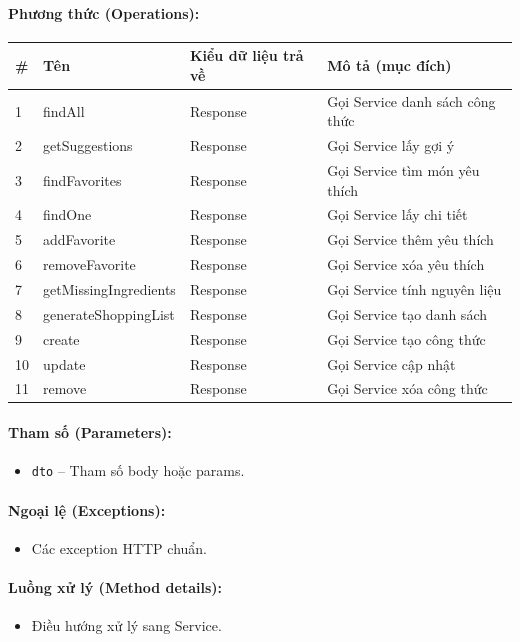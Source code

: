 \documentclass[12pt,a4paper]{article}
\begin{document}
\paragraph{Phương thức (Operations):}
\begin{longtable}{|p{0.6cm}|p{3.8cm}|p{2.6cm}|p{6.5cm}|}
\hline
\textbf{\#} & \textbf{Tên} & \textbf{Kiểu dữ liệu trả về} & \textbf{Mô tả (mục đích)} \\ \hline
\endhead
1 & findAll & Response & Gọi Service danh sách công thức \\ \hline
2 & getSuggestions & Response & Gọi Service lấy gợi ý \\ \hline
3 & findFavorites & Response & Gọi Service tìm món yêu thích \\ \hline
4 & findOne & Response & Gọi Service lấy chi tiết \\ \hline
5 & addFavorite & Response & Gọi Service thêm yêu thích \\ \hline
6 & removeFavorite & Response & Gọi Service xóa yêu thích \\ \hline
7 & getMissingIngredients & Response & Gọi Service tính nguyên liệu \\ \hline
8 & generateShoppingList & Response & Gọi Service tạo danh sách \\ \hline
9 & create & Response & Gọi Service tạo công thức \\ \hline
10 & update & Response & Gọi Service cập nhật \\ \hline
11 & remove & Response & Gọi Service xóa công thức \\ \hline
\end{longtable}

\paragraph{Tham số (Parameters):}
\begin{itemize}[leftmargin=*]
    \item \texttt{dto} – Tham số body hoặc params.
\end{itemize}


\paragraph{Ngoại lệ (Exceptions):}
\begin{itemize}[leftmargin=*]
    \item Các exception HTTP chuẩn.
\end{itemize}


\paragraph{Luồng xử lý (Method details):}
\begin{itemize}[leftmargin=*]
    \item Điều hướng xử lý sang Service.
\end{itemize}
\end{document}
